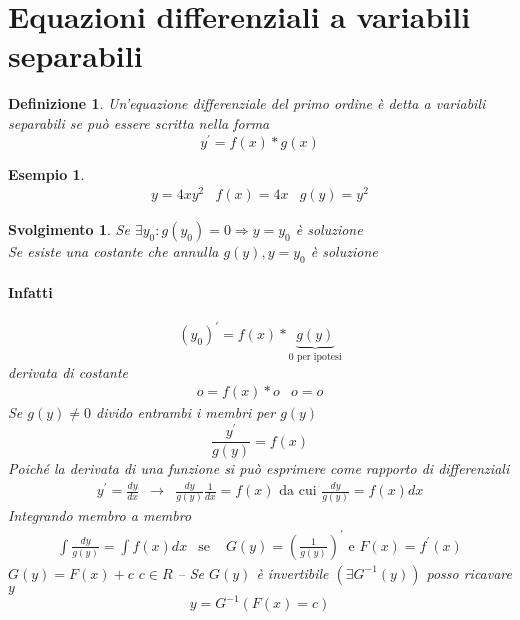 \documentclass{book}
\newtheorem{defi}{Definizione}
\newtheorem{esempio}{Esempio}
\newtheorem{svol}{Svolgimento}
\begin{document}
\section{Equazioni differenziali a variabili separabili}
\begin{defi}
  Un'equazione differenziale del primo ordine è detta a variabili separabili se può
  essere scritta nella forma
  \begin{equation*}
    y^\prime =f(x)*g(x)
  \end{equation*}
\end{defi}
\begin{esempio}
  \begin{eqnarray*}
    y=4xy^2 & f(x)=4x & g(y)=y^2
  \end{eqnarray*}  
\end{esempio}
\begin{svol}
  Se $\exists y_0:g(y_0)=0\Rightarrow y=y_0$ è soluzione \\
  Se esiste una costante che annulla $g(y),y=y_0$ è soluzione
  \paragraph{Infatti}
  \begin{equation*}
    (y_0)^\prime=f(x)*\underbrace{g(y)}_{0 \text{ per ipotesi}}
  \end{equation*}
  derivata di costante
  \begin{eqnarray*}
    o=f(x)*o&o=o
  \end{eqnarray*}
  Se $g(y)\neq 0$ divido entrambi i membri per $g(y)$
  \begin{equation*}
    \frac{y^\prime}{g(y)}=f(x)
  \end{equation*}
  Poiché la derivata di una funzione si può esprimere come rapporto di differenziali
  \begin{eqnarray*}
    y^\prime=\frac{dy}{dx}&\to& \frac{dy}{g(y)}\frac{1}{dx}=f(x) \text{ da cui } \frac{dy}{g(y)}=f(x)dx
  \end{eqnarray*}
  Integrando membro a membro
  \begin{eqnarray*}
    \int \frac{dy}{g(y)}=\int f(x)dx & \text{se }& G(y)=\left(\frac{1}{g(y)}\right)^\prime \text{ e } F(x)=f^\prime (x)
  \end{eqnarray*}
  $G(y)=F(x)+c$ $c\in R$ -- Se $G(y)$ è invertibile $(\exists G^{-1}(y))$ posso ricavare
  $y$
  \begin{equation*}
    y=G^{-1}(F(x)=c)
  \end{equation*}
\end{svol}
\end{document}
